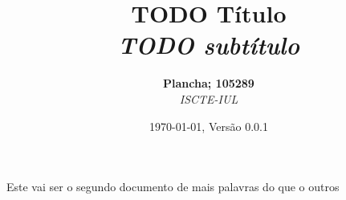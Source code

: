 \documentclass[12pt]{diazessay}
\title{\textbf{TODO Título} \\ {\Large\itshape TODO subtítulo}}
\author{\textbf{Plancha; 105289} \\ \textit{ISCTE-IUL}}
\date{\today , Versão 0.0.1}
\begin{document}
\maketitle

Este vai ser o segundo documento de mais palavras do que o outros
\end{document}
